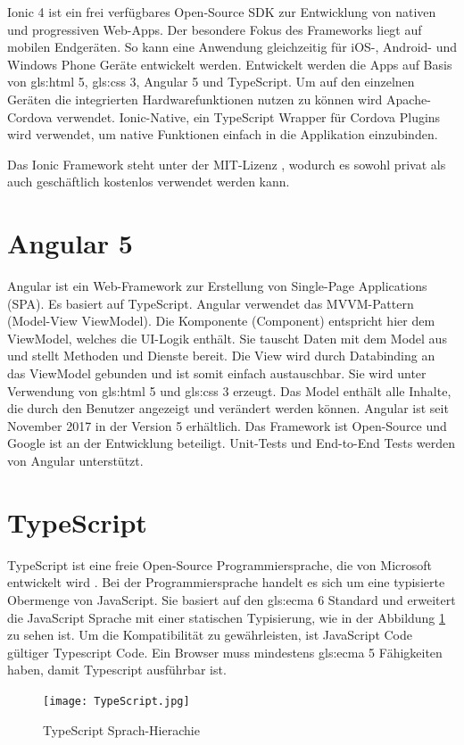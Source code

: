 Ionic 4 ist ein frei verfügbares Open-Source SDK zur Entwicklung von nativen und progressiven Web-Apps.
Der besondere Fokus des Frameworks liegt auf mobilen Endgeräten. So kann eine Anwendung gleichzeitig für iOS-, Android- und Windows Phone Geräte entwickelt werden.
Entwickelt werden die Apps auf Basis von \gls{gls:html} 5, \gls{gls:css} 3, Angular 5 und TypeScript. Um auf den einzelnen Geräten die integrierten Hardwarefunktionen nutzen zu können wird Apache-Cordova verwendet. Ionic-Native, ein TypeScript Wrapper für Cordova Plugins wird verwendet, um native Funktionen einfach in die Applikation einzubinden.

Das Ionic Framework steht unter der MIT-Lizenz \cite{mitlizenz}, wodurch es sowohl privat als auch geschäftlich kostenlos verwendet werden kann.

\section{Angular 5}
\label{sec:Angular}
Angular ist ein Web-Framework zur Erstellung von Single-Page Applications (SPA). Es basiert auf TypeScript. Angular verwendet das MVVM-Pattern (Model-View ViewModel). 
Die Komponente (Component) entspricht hier dem ViewModel, welches die UI-Logik enthält. Sie tauscht Daten mit dem Model aus und stellt Methoden und Dienste bereit. 
Die View wird durch Databinding an das ViewModel gebunden und ist somit einfach austauschbar. 
Sie wird unter Verwendung von \gls{gls:html} 5 und \gls{gls:css} 3 erzeugt. 
Das Model enthält alle Inhalte, die durch den Benutzer angezeigt und verändert werden können.
Angular ist seit November 2017 in der Version 5 erhältlich. Das Framework ist Open-Source und Google ist an der Entwicklung beteiligt. Unit-Tests und End-to-End Tests werden von Angular unterstützt.  \cite{angulario}
 

\section{TypeScript}
\label{typescript}
TypeScript ist eine freie Open-Source Programmiersprache, die von Microsoft entwickelt
wird \cite{TSDoc}.  Bei der Programmiersprache handelt es sich um eine typisierte Obermenge von JavaScript.
Sie basiert auf den \gls{gls:ecma} 6 Standard und erweitert die JavaScript Sprache mit einer statischen Typisierung, wie in der Abbildung \ref{img:typescript} zu sehen ist. Um die Kompatibilität zu gewährleisten, ist JavaScript Code gültiger Typescript Code. Ein Browser muss mindestens \gls{gls:ecma} 5 Fähigkeiten haben, damit Typescript ausführbar ist. 
\begin{figure}[htbp]
	\centering
	\texttt{[image: TypeScript.jpg]}
	\caption{TypeScript Sprach-Hierachie \cite{tshirachie}}
	\label{img:typescript}
\end{figure} 

